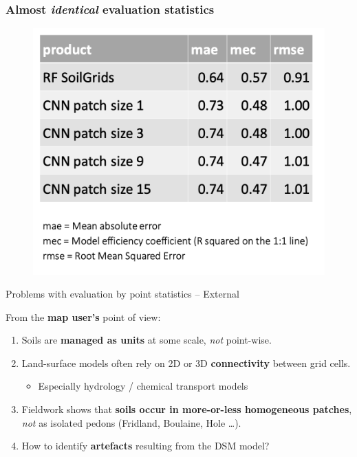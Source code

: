 \documentclass[aspectratio=169, 10pt]{beamer}
\begin{document}
\begin{frame}
  \frametitle{Almost \emph{identical} evaluation statistics}
    \begin{figure}
        \centering
\includegraphics[height=0.7\textheight]{./graphics_david/Genova_poster_stats.png}
\end{figure}
\end{frame}




\begin{frame}{Problems with evaluation by point statistics -- External}

From the \textbf{map user's} point of view:
\begin{enumerate}
\item  Soils are \textbf{managed as units} at some scale, \emph{not} point-wise.
\item  Land-surface models often rely on 2D or 3D \textbf{connectivity} between grid cells.
  \begin{itemize}
  \item Especially hydrology / chemical transport models
  \end{itemize}
\item  Fieldwork shows that \textbf{soils  occur in more-or-less homogeneous patches}, \emph{not} as isolated
  pedons (Fridland, Boulaine, Hole \ldots).
\item How to identify \textbf{artefacts} resulting from the DSM model?
  \end{enumerate}
  
\end{frame}
\end{document}
